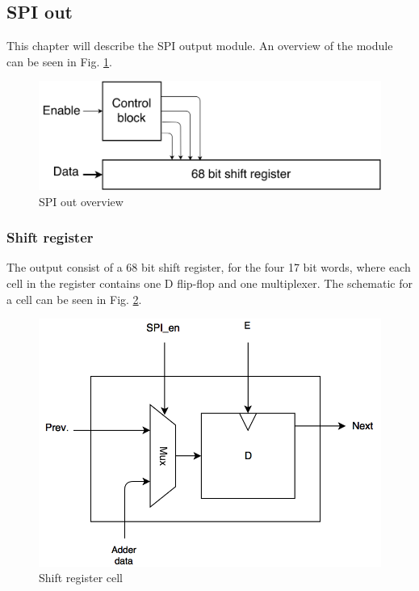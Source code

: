 
 \newpage
\subsection{SPI out}
This chapter will describe the SPI output module. An overview of the module can be seen in Fig. \ref{spi_out}.

\begin{figure}[H]
\centering
\captionsetup{justification=centering}
\includegraphics[scale=0.15]{../figures/spi_out.png}
\caption{SPI out overview}
\label{spi_out}
\end{figure}

\subsubsection{Shift register}
The output consist of a 68 bit shift register, for the four 17 bit words, where each cell in the register contains one D flip-flop and one multiplexer. The schematic for a cell can be seen in Fig. \ref{mux_dff}.

\begin{figure}[H]
\centering
\captionsetup{justification=centering}
\includegraphics[scale=0.35]{../figures/MUX_DFF.png}
\caption{Shift register cell}
\label{mux_dff}
\end{figure}


